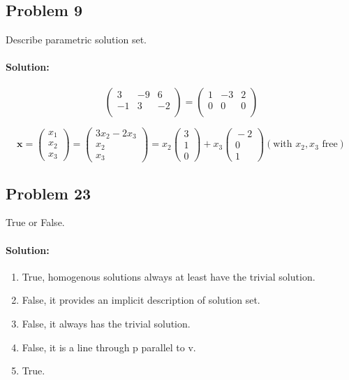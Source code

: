 \documentclass[11pt, notitlepage]{report}
\newenvironment{solution}{\paragraph{\small Solution:}}{\hfill}
\begin{document}
\newpage
\subsection{Problem 9}
Describe parametric solution set.

\begin{solution}

\[\left(\begin{matrix}{}
  3& -9&6 \\
  -1&3 &-2 \\
\end{matrix}\right)=
\left(\begin{matrix}{}
  1& -3&2 \\
  0&0 &0 \\
\end{matrix}\right)
\]

\[
\textbf{x}= \left(\begin{matrix}{}
  x_1\\
  x_2\\
  x_3
\end{matrix}\right)
= \left(\begin{matrix}{}
  3x_2-2x_3\\
  x_2\\
  x_3
\end{matrix}\right)
= x_2
\left(\begin{matrix}{}
  3 \\
  1 \\
  0
\end{matrix}\right)+
x_3
\left(\begin{matrix}{}
  -2 \\
  0 \\
  1
\end{matrix}\right) (\text{with $x_2,x_3$ free})
\]

\end{solution}

\subsection{Problem 23}
True or False.

\begin{solution}
\begin{enumerate}[label=\alph*.)]
	\item True, homogenous solutions always at least have the trivial solution.
	\item False, it provides an implicit description of solution set.
	\item False, it always has the trivial solution.
	\item False, it is a line through p parallel to v.
	\item True.
\end{enumerate}
\end{solution}
\end{document}
